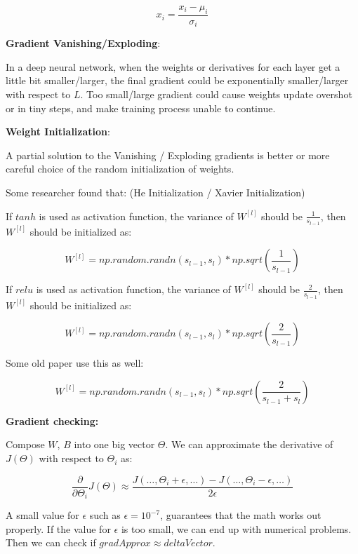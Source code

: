 \documentclass{article}
\begin{document}
\[x_i = \frac{x_i - \mu_i}{\sigma_i}\]

\noindent \textbf{Gradient Vanishing/Exploding}:

\noindent In a deep neural network, when the weights or derivatives for each layer get a little bit smaller/larger, the final gradient could be exponentially smaller/larger with respect to \(L\). Too small/large gradient could cause weights update overshot or in tiny steps, and make training process unable to continue.

\bigskip

\noindent \textbf{Weight Initialization}:

\noindent A partial solution to the Vanishing / Exploding gradients is better or more careful choice of the random initialization of weights. 

\bigskip

\noindent Some researcher found that: (He Initialization / Xavier Initialization)

\bigskip

\noindent If \(tanh\) is used as activation function, the variance of \(W^{[l]}\) should be \(\frac{1}{s_{l - 1}}\), then \(W^{[l]}\) should be initialized as:

\[W^{[l]} = np.random.randn(s_{l - 1}, s_l) * np.sqrt(\frac{1}{s_{l - 1}}) \]

\noindent If \(relu\) is used as activation function, the variance of \(W^{[l]}\) should be \(\frac{2}{s_{l - 1}}\), then \(W^{[l]}\) should be initialized as:

\[W^{[l]} = np.random.randn(s_{l - 1}, s_l) * np.sqrt(\frac{2}{s_{l - 1}}) \]

\noindent Some old paper use this as well:

\[W^{[l]} = np.random.randn(s_{l - 1}, s_l) * np.sqrt(\frac{2}{s_{l - 1} + s_{l}}) \]

\noindent \textbf{Gradient checking:}

\noindent Compose \(W\), \(B\) into one big vector \(\Theta\). We can approximate the derivative of \(J(\Theta)\) with respect to \(\Theta_{i}\) as:

\[\frac{\partial}{\partial \Theta_{i}} J(\Theta) \approx \frac{J(\dots, \Theta_{i} + \epsilon, \dots) - J(\dots, \Theta_{i} - \epsilon, \dots)}{2\epsilon}\]

\noindent A small value for \(\epsilon\) such as \(\epsilon = 10^{-7}\), guarantees that the math works out properly. If the value for \(\epsilon\) is too small, we can end up with numerical problems. Then we can check if \(gradApprox \approx deltaVector\).
\end{document}
